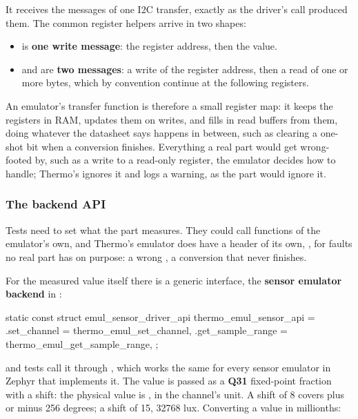 \noindent It receives the messages of one I2C transfer, exactly as the driver’s call produced them.
The common register helpers arrive in two shapes:

\begin{itemize}
  \item {} is \textbf{one write message}: the register address, then the value.
  \item {} and  are \textbf{two messages}: a write of
    the register address, then a read of one or more bytes, which by convention continue at the
    following registers.
\end{itemize}

An emulator’s transfer function is therefore a small register map: it keeps the registers in RAM,
updates them on writes, and fills in read buffers from them, doing whatever the datasheet says
happens in between, such as clearing a one-shot bit when a conversion finishes. Everything a real
part would get wrong-footed by, such as a write to a read-only register, the emulator decides how to
handle; Thermo’s ignores it and logs a warning, as the part would ignore it.

\subsubsection{The backend API}
Tests need to set what the part measures. They could call functions of the emulator’s own, and
Thermo’s emulator does have a header of its own, , for faults no real part has
on purpose: a wrong , a conversion that never finishes.

For the measured value itself there is a generic interface, the \textbf{sensor emulator backend} in
:

\begin{ccode}
static const struct emul_sensor_driver_api thermo_emul_sensor_api = {
	.set_channel = thermo_emul_set_channel,
	.get_sample_range = thermo_emul_get_sample_range,
};
\end{ccode}

\noindent and tests call it through , which works the same
for every sensor emulator in Zephyr that implements it. The value is passed as a \textbf{Q31}
fixed-point fraction with a shift: the physical value is , in the
channel’s unit. A shift of 8 covers plus or minus 256 degrees; a shift of 15, 32768 lux. Converting
a value in millionths:

